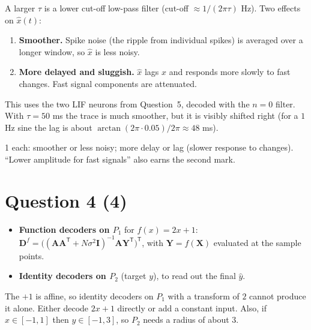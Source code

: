 \documentclass[11pt,letterpaper]{article}
\newcommand{\T}{\mathsf T}
\newcommand{\ans}[1]{\par\vspace{4pt}{\bfseries #1}\quad}
\begin{document}
\ans{(b) [2]}
A larger $\tau$ is a lower cut-off low-pass filter (cut-off $\approx 1/(2\pi\tau)$ Hz). Two effects on $\hat x(t)$:
\begin{enumerate}[leftmargin=1.6em, label=\arabic*.]
\item \textbf{Smoother.} Spike noise (the ripple from individual spikes) is averaged over a longer window, so $\hat x$ is less noisy.
\item \textbf{More delayed and sluggish.} $\hat x$ lags $x$ and responds more slowly to fast changes. Fast signal components are attenuated.
\end{enumerate}
\begin{center}
\end{center}
This uses the two LIF neurons from Question~5, decoded with the $n = 0$ filter. With $\tau = 50$ ms the trace is much smoother, but it is visibly shifted right (for a $1$ Hz sine the lag is about $\arctan(2\pi \cdot 0.05)/2\pi \approx 48$ ms).
\begin{marking}
1 each: smoother or less noisy; more delay or lag (slower response to changes). ``Lower amplitude for fast signals'' also earns the second mark.
\end{marking}

\section*{Question 4 \hfill (4)}

\ans{(a) [1]}
\begin{itemize}[leftmargin=1.2em]
\item \textbf{Function decoders on $P_1$} for $f(x) = 2x + 1$:
$\mathbf D^{f} = \bigl((\mathbf A\mathbf A^\T + N\sigma^2\mathbf I)^{-1}\mathbf A\mathbf Y^\T\bigr)^\T$, with $\mathbf Y = f(\mathbf X)$ evaluated at the sample points.
\item \textbf{Identity decoders on $P_2$} (target $y$), to read out the final $\hat y$.
\end{itemize}
The $+1$ is affine, so identity decoders on $P_1$ with a transform of $2$ cannot produce it alone. Either decode $2x + 1$ directly or add a constant input. Also, if $x \in [-1, 1]$ then $y \in [-1, 3]$, so $P_2$ needs a radius of about $3$.
\end{document}

